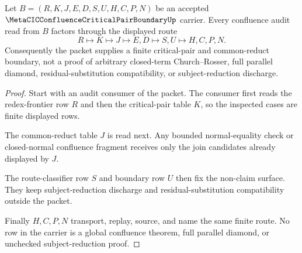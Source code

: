 \begin{theorem}
\label{thm:metacic-confluence-critical-pair-common-reduct-boundary}
Let $B=(R,K,J,E,D,S,U,H,C,P,N)$ be an accepted
$\MetaCICConfluenceCriticalPairBoundaryUp$ carrier. Every confluence audit read
from $B$ factors through the displayed route
$$
R \longmapsto K \longmapsto J \longmapsto E,D \longmapsto S,U \longmapsto H,C,P,N .
$$
Consequently the packet supplies a finite critical-pair and common-reduct
boundary, not a proof of arbitrary closed-term Church--Rosser, full parallel
diamond, residual-substitution compatibility, or subject-reduction discharge.
\end{theorem}
\begin{proof}
Start with an audit consumer of the packet. The consumer first reads the
redex-frontier row $R$ and then the critical-pair table $K$, so the inspected
cases are finite displayed rows.

The common-reduct table $J$ is read next. Any bounded normal-equality check or
closed-normal confluence fragment receives only the join candidates already
displayed by $J$.

The route-classifier row $S$ and boundary row $U$ then fix the non-claim
surface. They keep subject-reduction discharge and residual-substitution
compatibility outside the packet.

Finally $H,C,P,N$ transport, replay, source, and name the same finite route.
No row in the carrier is a global confluence theorem, full parallel diamond, or
unchecked subject-reduction proof.
\end{proof}

